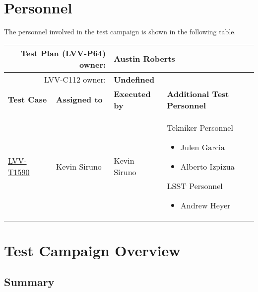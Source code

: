\documentclass[SE,lsstdraft,STR,toc]{lsstdoc}
\providecommand{\tightlist}{
  \setlength{\itemsep}{0pt}\setlength{\parskip}{0pt}}
\begin{document}
\newpage
\section{Personnel}
\label{sect:personnel}

The personnel involved in the test campaign is shown in the following table.

\begin{longtable}{p{3cm}p{3cm}p{3cm}p{6cm}}
\hline
\multicolumn{2}{r}{Test Plan (LVV-P64) owner:} &
\multicolumn{2}{l}{\textbf{ Austin Roberts } }\\\hline
\multicolumn{2}{r}{ LVV-C112 owner:} &
\multicolumn{2}{l}{\textbf{
    Undefined
}
} \\\hline
\textbf{Test Case} & \textbf{Assigned to} & \textbf{Executed by} & \textbf{Additional Test Personnel} \\ \hline
\href{https://jira.lsstcorp.org/secure/Tests.jspa#/testCase/LVV-T1590}{LVV-T1590}
& {\small Kevin Siruno } & {\small Kevin Siruno } &
\begin{minipage}[]{6cm}
\smallskip
{\small  Tekniker Personnel

\begin{itemize}
\tightlist
\item
  Julen Garcia
\item
  Alberto Izpizua
\end{itemize}

LSST Personnel

\begin{itemize}
\tightlist
\item
  Andrew Heyer
\end{itemize}
 }
\medskip
\end{minipage}
\\ \hline
\end{longtable}

\newpage

\section{Test Campaign Overview}
\label{sect:overview}

\subsection{Summary}
\label{sect:summarytable}
\end{document}
